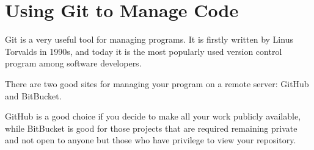 \documentclass[../main.tex]{subfiles}
\begin{document}
    \section{Using Git to Manage Code}
    Git is a very useful tool for managing programs. It is firstly written by
    Linus Torvalds in 1990s, and today it is the most popularly used version
    control program among software developers.

    There are two good sites for managing your program on a remote server: GitHub
    and BitBucket.

    GitHub is a good choice if you decide to make all your work publicly available,
    while BitBucket is good for those projects that are required remaining private
    and not open to anyone but those who have privilege to view your repository.
\end{document}
